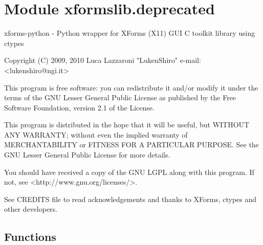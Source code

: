 %
%
%


\section{Module xformslib.deprecated}

    \label{xformslib:deprecated}
xforms-python - Python wrapper for XForms (X11) GUI C toolkit library using
ctypes

Copyright (C) 2009, 2010  Luca Lazzaroni "LukenShiro" e-mail: 
{\textless}lukenshiro@ngi.it{\textgreater}

This program is free software: you can redistribute it and/or modify it 
under the terms of the GNU Lesser General Public License as published by 
the Free Software Foundation, version 2.1 of the License.

This program is distributed in the hope that it will be useful, but WITHOUT
ANY WARRANTY; without even the implied warranty of MERCHANTABILITY or 
FITNESS FOR A PARTICULAR PURPOSE. See the GNU Lesser General Public License
for more details.

You should have received a copy of the GNU LGPL along with this program. If
not, see {\textless}http://www.gnu.org/licenses/{\textgreater}.

See CREDITS file to read acknowledgements and thanks to XForms, ctypes and 
other developers.



  \subsection{Functions}

    \label{xformslib:deprecated:warn_deprecated_function}

